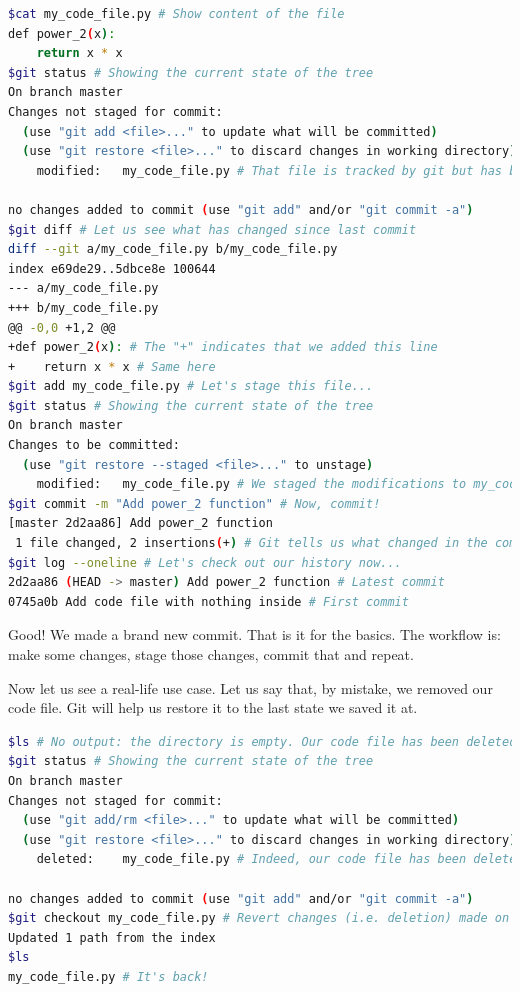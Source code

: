 \documentclass[12pt]{article}
\begin{document}
\begin{lstlisting}[language=bash]
$cat my_code_file.py # Show content of the file
def power_2(x):
    return x * x
$git status # Showing the current state of the tree
On branch master
Changes not staged for commit:
  (use "git add <file>..." to update what will be committed)
  (use "git restore <file>..." to discard changes in working directory)
	modified:   my_code_file.py # That file is tracked by git but has been modified. In the previous example, it was not tracked by git at all so its label was "new file", not "modified"

no changes added to commit (use "git add" and/or "git commit -a")
$git diff # Let us see what has changed since last commit
diff --git a/my_code_file.py b/my_code_file.py
index e69de29..5dbce8e 100644
--- a/my_code_file.py
+++ b/my_code_file.py
@@ -0,0 +1,2 @@
+def power_2(x): # The "+" indicates that we added this line
+    return x * x # Same here
$git add my_code_file.py # Let's stage this file...
$git status # Showing the current state of the tree
On branch master
Changes to be committed:
  (use "git restore --staged <file>..." to unstage)
	modified:   my_code_file.py # We staged the modifications to my_code_file.py
$git commit -m "Add power_2 function" # Now, commit!
[master 2d2aa86] Add power_2 function
 1 file changed, 2 insertions(+) # Git tells us what changed in the commit we just made
$git log --oneline # Let's check out our history now...
2d2aa86 (HEAD -> master) Add power_2 function # Latest commit
0745a0b Add code file with nothing inside # First commit
\end{lstlisting}

Good! We made a brand new commit. That is it for the basics. The workflow is: make some changes, stage those changes, commit that and repeat.

Now let us see a real-life use case. Let us say that, by mistake, we removed our code file. Git will help us restore it to the last state we saved it at.

\begin{lstlisting}[language=bash]
$ls # No output: the directory is empty. Our code file has been deleted!
$git status # Showing the current state of the tree
On branch master
Changes not staged for commit:
  (use "git add/rm <file>..." to update what will be committed)
  (use "git restore <file>..." to discard changes in working directory)
	deleted:    my_code_file.py # Indeed, our code file has been deleted

no changes added to commit (use "git add" and/or "git commit -a")
$git checkout my_code_file.py # Revert changes (i.e. deletion) made on my_code_file.py
Updated 1 path from the index
$ls
my_code_file.py # It's back!
\end{lstlisting}
\end{document}
